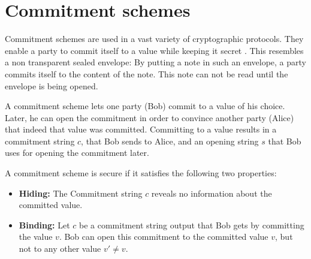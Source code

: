\documentclass{cacthesis}
\begin{document}
\section{Commitment schemes}
Commitment schemes are used in a vast variety of cryptographic protocols. They enable a party to commit itself to a value while keeping it secret \cite{Goldreich2001-bv}. This resembles a non transparent sealed envelope: By putting a note in such an envelope, a party commits itself to the content of the note. This note can not be read until the envelope is being opened.\newline

 A commitment scheme lets one party (Bob) commit to a value of his choice. Later, he can open the commitment in order to convince another party (Alice) that indeed that value was committed. Committing to a value results in a commitment string $c$, that Bob sends to Alice, and an opening string $s$ that Bob uses for opening the commitment later\cite{boneh_graduate_nodate}.\newline
 
 A commitment scheme is secure if it satisfies the following two properties:
 \begin{itemize}
     \item \textbf{Hiding:} The Commitment string $c$ reveals no information about the committed value\cite{boneh_graduate_nodate}.
     \item \textbf{Binding:} Let $c$ be a commitment string output that Bob gets by committing the value $v$. Bob can open this commitment to the committed value $v$, but not to any other value $v'\neq v$.
 \end{itemize}
\end{document}
